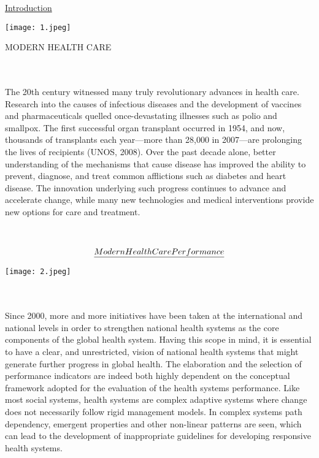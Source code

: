 \documentclass[12pt]{article}
\begin{document}
\begin{aling}
\newpage
\LARGE{\underline{Introduction}}
\end{aling}
\begin{center}
 \texttt{[image: 1.jpeg]}
\caption{MODERN HEALTH CARE}
\end{center}
\\
\\
The 20th century witnessed many truly revolutionary advances in health care. Research into the causes of infectious diseases and the development of vaccines and pharmaceuticals quelled once-devastating illnesses such as polio and smallpox. The first successful organ transplant occurred in 1954, and now, thousands of transplants each year—more than 28,000 in 2007—are prolonging the lives of recipients (UNOS, 2008). Over the past decade alone, better understanding of the mechanisms that cause disease has improved the ability to prevent, diagnose, and treat common afflictions such as diabetes and heart disease. The innovation underlying such progress continues to advance and accelerate change, while many new technologies and medical interventions provide new options for care and treatment.
\\
\\
\\
\newpage
\begin{align}
\LARGE{\underline{Modern Health Care Performance}}
\end{align}
\begin{center}
    \texttt{[image: 2.jpeg]}
\end{center}
\\
\\
Since 2000, more and more initiatives have been taken at the international and national levels in order to strengthen national health systems as the core components of the global health system. Having this scope in mind, it is essential to have a clear, and unrestricted, vision of national health systems that might generate further progress in global health. The elaboration and the selection of performance indicators are indeed both highly dependent on the conceptual framework adopted for the evaluation of the health systems performance. Like most social systems, health systems are complex adaptive systems where change does not necessarily follow rigid management models. In complex systems path dependency, emergent properties and other non-linear patterns are seen, which can lead to the development of inappropriate guidelines for developing responsive health systems. 
\end{document}
